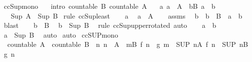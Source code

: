 \begin{isabellebody}
\isanewline
{}\isamarkupfalse%
\ ccSup{\isacharunderscore}mono{\isacharcolon}\isanewline
\ \ \ {\isacharbrackleft}intro{\isacharbrackright}{\isacharcolon}\ {\isachardoublequoteopen}countable\ B{\isachardoublequoteclose}\ {\isachardoublequoteopen}countable\ A{\isachardoublequoteclose}\isanewline
\ \ \ {\isachardoublequoteopen}{\isasymAnd}a{\isachardot}\ a\ {\isasymin}\ A\ {\isasymLongrightarrow}\ {\isasymexists}b{\isasymin}B{\isachardot}\ a\ {\isasymle}\ b{\isachardoublequoteclose}\isanewline
\ \ \ {\isachardoublequoteopen}Sup\ A\ {\isasymle}\ Sup\ B{\isachardoublequoteclose}\isanewline
%
\isadelimproof
%
\endisadelimproof
%
\isatagproof
{}\isamarkupfalse%
\ {\isacharparenleft}rule\ ccSup{\isacharunderscore}least{\isacharparenright}\isanewline
\ \ \isamarkupfalse%
\ a\ \isamarkupfalse%
\ {\isachardoublequoteopen}a\ {\isasymin}\ A{\isachardoublequoteclose}\isanewline
\ \ \isamarkupfalse%
\ assms\ \isamarkupfalse%
\ b\ \ {\isachardoublequoteopen}b\ {\isasymin}\ B{\isachardoublequoteclose}\ \ {\isachardoublequoteopen}a\ {\isasymle}\ b{\isachardoublequoteclose}\ \isamarkupfalse%
\ blast\isanewline
\ \ \isamarkupfalse%
\ {\isacartoucheopen}b\ {\isasymin}\ B{\isacartoucheclose}\ \isamarkupfalse%
\ {\isachardoublequoteopen}b\ {\isasymle}\ Sup\ B{\isachardoublequoteclose}\ \isamarkupfalse%
\ {\isacharparenleft}rule\ ccSup{\isacharunderscore}upper{\isacharbrackleft}rotated{\isacharbrackright}{\isacharparenright}\ auto\isanewline
\ \ \isamarkupfalse%
\ {\isacartoucheopen}a\ {\isasymle}\ b{\isacartoucheclose}\ \isamarkupfalse%
\ {\isachardoublequoteopen}a\ {\isasymle}\ Sup\ B{\isachardoublequoteclose}\ \isamarkupfalse%
\ auto\isanewline
{}\isamarkupfalse%
\ auto%
\endisatagproof
{\isafoldproof}%
%
\isadelimproof
\isanewline
%
\endisadelimproof
\isanewline
{}\isamarkupfalse%
\ ccSUP{\isacharunderscore}mono{\isacharcolon}\isanewline
\ \ {\isachardoublequoteopen}countable\ A\ {\isasymLongrightarrow}\ countable\ B\ {\isasymLongrightarrow}\ {\isacharparenleft}{\isasymAnd}n{\isachardot}\ n\ {\isasymin}\ A\ {\isasymLongrightarrow}\ {\isasymexists}m{\isasymin}B{\isachardot}\ f\ n\ {\isasymle}\ g\ m{\isacharparenright}\ {\isasymLongrightarrow}\ {\isacharparenleft}SUP\ n{\isasymin}A{\isachardot}\ f\ n{\isacharparenright}\ {\isasymle}\ {\isacharparenleft}SUP\ n{\isasymin}B{\isachardot}\ g\ n{\isacharparenright}{\isachardoublequoteclose}\isanewline

\end{isabellebody}
